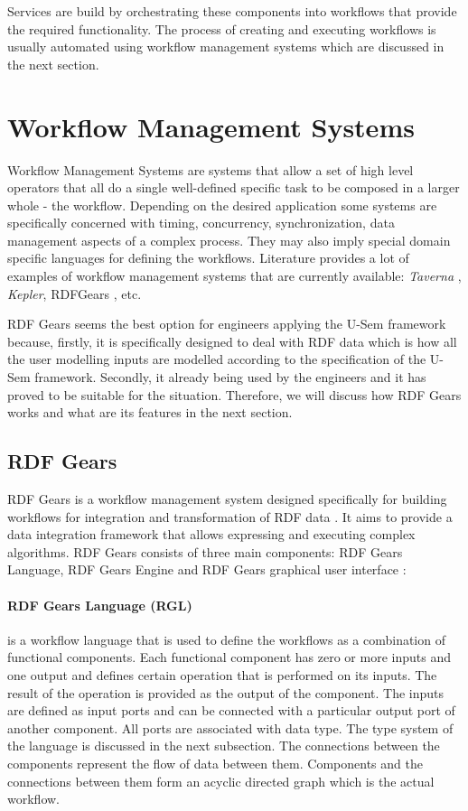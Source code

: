 Services are build by orchestrating these components into workflows that provide the required functionality. The process of creating and executing workflows is usually automated using workflow management systems which are discussed in the next section.

\section{Workflow Management Systems}
Workflow Management Systems are systems that allow a set of high level operators that all do a single well-defined specific task to be composed in a larger whole - the workflow. Depending on the desired application some systems are specifically concerned with  timing, concurrency, synchronization, data management aspects of a complex process. They may also imply special domain specific languages for defining the workflows. Literature provides a lot of examples of workflow management systems that are currently available: \textit{Taverna} \cite{Hull06}, \textit{Kepler}, RDFGears \cite{Feliksik11}, etc.

RDF Gears seems the best option for engineers applying the U-Sem framework because, firstly, it is specifically designed to deal with RDF data which is how all the user modelling inputs are modelled according to the specification of the U-Sem framework. Secondly, it already being used by the engineers and it has proved to be suitable for the situation. Therefore, we will discuss how RDF Gears works and what are its features in the next section.

\subsection{RDF Gears}

RDF Gears is a workflow management system designed specifically for building workflows for integration and transformation of RDF data \cite{Feliksik11}. It aims to provide a data integration framework that allows expressing and executing complex algorithms. RDF Gears consists of three main components: RDF Gears Language, RDF Gears Engine and RDF Gears graphical user interface \cite{Feliksik11}:

\paragraph{RDF Gears Language (RGL)} is a workflow language that is used to define the workflows as a combination of functional components. Each functional component has zero or more inputs and one output and defines certain operation that is performed on its inputs. The result of the operation is provided as the output of the component. The inputs are defined as input ports and can be connected with a particular output port of another component. All ports are associated with data type. The type system of the language is discussed in the next subsection. The connections between the components represent the flow of data between them. Components and the connections between them form an acyclic directed graph which is the actual workflow. 

